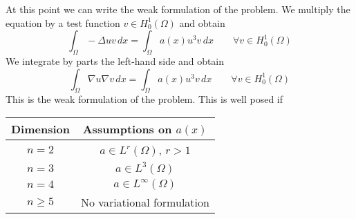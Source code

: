     At this point we can write the weak formulation of the problem. We multiply the equation by a test function \(v \in H^1_0(\Omega)\) and obtain 
    \[
        \int_\Omega - \Delta u v \, dx = \int_\Omega a(x) u^3 v \, dx \qquad \forall v \in H^1_0(\Omega)
    \]
    We integrate by parts the left-hand side and obtain
    \[
        \int_\Omega \nabla u \nabla v \, dx = \int_\Omega a(x) u^3 v \, dx \qquad \forall v \in H^1_0(\Omega)
    \]
    This is the weak formulation of the problem. This is well posed if 
    \begin{table}[h]
        \centering
        \begin{tabular}{|c|c|}
            \hline
            Dimension & Assumptions on $a(x)$ \\
            \hline
            $n = 2$ & $a \in L^r(\Omega)$, $r > 1$ \\
            $n = 3$ & $a \in L^3(\Omega)$ \\
            $n = 4$ & $a \in L^\infty(\Omega)$ \\
            $n \geq 5$ & No variational formulation \\
            \hline
        \end{tabular}
    \end{table}

\newpage